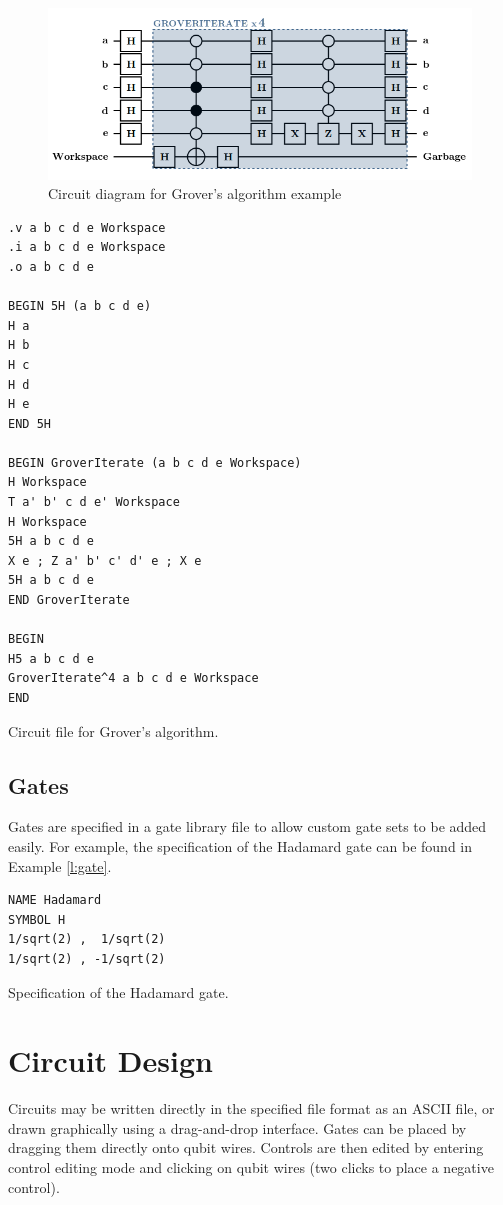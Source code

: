 \documentclass[aps,prl,reprint,floatfix,superscriptaddress]{revtex4-1} %
\begin{document}
\begin{figure}[ht]
\includegraphics[scale=0.47]{grover_circuit}
\caption{Circuit diagram for Grover's algorithm example}
\label{f:grover}
\end{figure}

\begin{program}
\begin{verbatim}
.v a b c d e Workspace
.i a b c d e Workspace
.o a b c d e

BEGIN 5H (a b c d e)
H a
H b
H c
H d 
H e
END 5H

BEGIN GroverIterate (a b c d e Workspace)
H Workspace
T a' b' c d e' Workspace
H Workspace
5H a b c d e
X e ; Z a' b' c' d' e ; X e
5H a b c d e
END GroverIterate

BEGIN
H5 a b c d e
GroverIterate^4 a b c d e Workspace
END
\end{verbatim}
\caption{Circuit file for Grover's algorithm.}
\label{l:circuit}
\end{program}
\subsection{Gates}\label{sub:gates}
Gates are specified in a gate library file to allow custom gate sets to be added easily.
For example, the specification of the Hadamard gate can be found in Example \ref{l:gate}.
\begin{program}
\begin{verbatim}
NAME Hadamard
SYMBOL H
1/sqrt(2) ,  1/sqrt(2)
1/sqrt(2) , -1/sqrt(2)
\end{verbatim}
\caption{Specification of the Hadamard gate.}
\label{l:gate}
\end{program}
\section{Circuit Design}
Circuits may be written directly in the specified file format as an ASCII file, or drawn graphically using a drag-and-drop interface.  
Gates can be placed by dragging them directly onto qubit wires.
Controls are then edited by entering control editing mode and clicking on qubit wires (two clicks to place a negative control).
\end{document}
